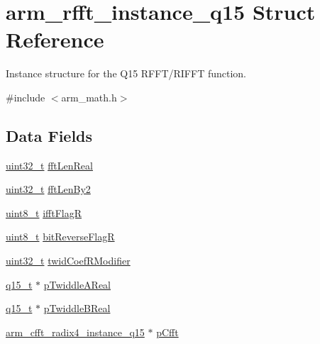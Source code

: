 \hypertarget{structarm__rfft__instance__q15}{\section{arm\-\_\-rfft\-\_\-instance\-\_\-q15 Struct Reference}
\label{structarm__rfft__instance__q15}
}


Instance structure for the Q15 R\-F\-F\-T/\-R\-I\-F\-F\-T function.  




{\ttfamily \#include $<$arm\-\_\-math.\-h$>$}

\subsection*{Data Fields}
\begin{DoxyCompactItemize}
\item 
\hyperlink{stdint_8h_a435d1572bf3f880d55459d9805097f62}{uint32\-\_\-t} \hyperlink{structarm__rfft__instance__q15_aac5cf9e825917cbb14f439e56bb86ab3}{fft\-Len\-Real}
\item 
\hyperlink{stdint_8h_a435d1572bf3f880d55459d9805097f62}{uint32\-\_\-t} \hyperlink{structarm__rfft__instance__q15_afef95bc722f5929d5e63ecba14fa3ca1}{fft\-Len\-By2}
\item 
\hyperlink{stdint_8h_aba7bc1797add20fe3efdf37ced1182c5}{uint8\-\_\-t} \hyperlink{structarm__rfft__instance__q15_a8051ffe268c147e431e1bea7bb4c4258}{ifft\-Flag\-R}
\item 
\hyperlink{stdint_8h_aba7bc1797add20fe3efdf37ced1182c5}{uint8\-\_\-t} \hyperlink{structarm__rfft__instance__q15_a4c65cd40e0098ec2f5c0dc31488b9bc6}{bit\-Reverse\-Flag\-R}
\item 
\hyperlink{stdint_8h_a435d1572bf3f880d55459d9805097f62}{uint32\-\_\-t} \hyperlink{structarm__rfft__instance__q15_afd444d05858c5f419980e94e8240d5c3}{twid\-Coef\-R\-Modifier}
\item 
\hyperlink{arm__math_8h_ab5a8fb21a5b3b983d5f54f31614052ea}{q15\-\_\-t} $\ast$ \hyperlink{structarm__rfft__instance__q15_affbf2de522ac029432d98e8373c0ec53}{p\-Twiddle\-A\-Real}
\item 
\hyperlink{arm__math_8h_ab5a8fb21a5b3b983d5f54f31614052ea}{q15\-\_\-t} $\ast$ \hyperlink{structarm__rfft__instance__q15_a937d815022adc557b435ba8c6cd58b0d}{p\-Twiddle\-B\-Real}
\item 
\hyperlink{structarm__cfft__radix4__instance__q15}{arm\-\_\-cfft\-\_\-radix4\-\_\-instance\-\_\-q15} $\ast$ \hyperlink{structarm__rfft__instance__q15_acd8f28f777f3417280212ce799ebef46}{p\-Cfft}
\end{DoxyCompactItemize}


